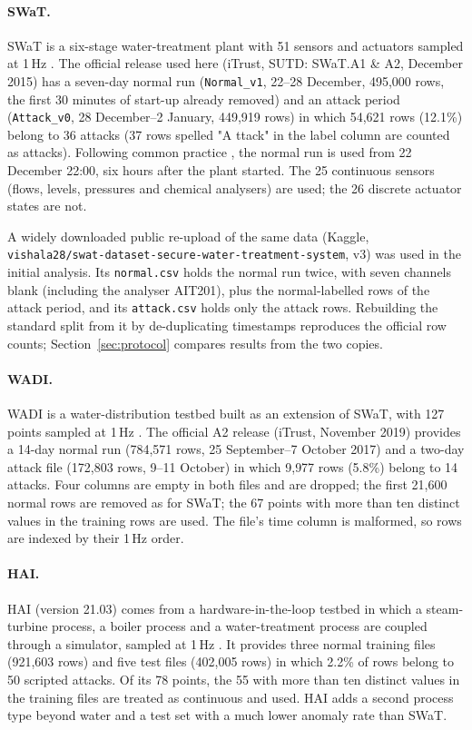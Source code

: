\documentclass[11pt]{article}
\begin{document}
\paragraph{SWaT.} SWaT is a six-stage water-treatment plant with 51 sensors and
actuators sampled at 1\,Hz \citep{goh2016,mathur2016}. The official release used here
(iTrust, SUTD: SWaT.A1 \& A2, December 2015) has a seven-day normal run
(\texttt{Normal\_v1}, 22--28 December, 495{,}000 rows, the first 30 minutes of start-up
already removed) and an attack period (\texttt{Attack\_v0}, 28 December--2 January,
449{,}919 rows) in which 54{,}621 rows (12.1\%) belong to 36 attacks (37 rows spelled
"A ttack" in the label column are counted as attacks). Following common practice
\citep{li2019madgan}, the normal run is used from 22 December 22:00, six hours after the
plant started. The 25 continuous sensors (flows, levels, pressures and chemical
analysers) are used; the 26 discrete actuator states are not.

A widely downloaded public re-upload of the same data (Kaggle,
\texttt{vishala28/swat-dataset-secure-water-treatment-system}, v3) was used in the
initial analysis. Its \texttt{normal.csv} holds the normal run twice, with seven
channels blank (including the analyser AIT201), plus the normal-labelled rows of the
attack period, and its \texttt{attack.csv} holds only the attack rows. Rebuilding the
standard split from it by de-duplicating timestamps reproduces the official row counts;
Section~\ref{sec:protocol} compares results from the two copies.

\paragraph{WADI.} WADI is a water-distribution testbed built as an extension of SWaT,
with 127 points sampled at 1\,Hz \citep{ahmed2017}. The official A2 release (iTrust,
November 2019) provides a 14-day normal run (784{,}571 rows, 25 September--7 October
2017) and a two-day attack file (172{,}803 rows, 9--11 October) in which 9{,}977 rows
(5.8\%) belong to 14 attacks. Four columns are empty in both files and are dropped; the
first 21{,}600 normal rows are removed as for SWaT; the 67 points with more than ten
distinct values in the training rows are used. The file's time column is malformed, so
rows are indexed by their 1\,Hz order.

\paragraph{HAI.} HAI (version 21.03) comes from a hardware-in-the-loop testbed in
which a steam-turbine process, a boiler process and a water-treatment process are
coupled through a simulator, sampled at 1\,Hz \citep{shin2020,shin2021}. It provides
three normal training files (921{,}603 rows) and five test files (402{,}005 rows) in
which 2.2\% of rows belong to 50 scripted attacks. Of its 78 points, the 55 with more
than ten distinct values in the training files are treated as continuous and used.
HAI adds a second process type beyond water and a test set with a much lower
anomaly rate than SWaT.
\end{document}
